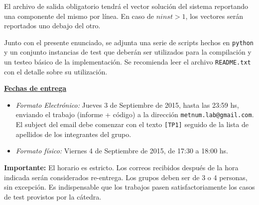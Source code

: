 El archivo de salida obligatorio tendr\'a el vector soluci\'on del sistema reportando una componente del mismo por
l\'inea. En caso de $ninst > 1$, los vectores ser\'an reportados uno debajo del otro.

Junto con el presente enunciado, se adjunta una serie de scripts hechos en \verb+python+ y un conjunto instancias de
test que deber\'an ser utilizados para la compilaci\'on y un testeo b\'asico de la implementaci\'on. Se recomienda leer
el archivo \verb+README.txt+ con el detalle sobre su utilizaci\'on.

{\bf \underline{Fechas de entrega}}
\begin{itemize}
\item \emph{Formato Electr\'onico:} Jueves 3 de Septiembre de 2015, hasta las 23:59 hs, enviando el trabajo (informe +
c\'odigo) a la direcci\'on \verb+metnum.lab@gmail.com+. El subject del email debe comenzar con el texto \verb+[TP1]+
seguido de la lista de apellidos de los integrantes del grupo.
\item \emph{Formato f\'isico:} Viernes 4 de Septiembre de 2015, de 17:30 a 18:00 hs.
\end{itemize}

\noindent \textbf{Importante:} El horario es estricto. Los correos recibidos despu\'es de la hora indicada ser\'an
considerados re-entrega. Los grupos deben ser de 3 o 4 personas, sin excepci\'on. Es indispensable que los trabajos
pasen satisfactoriamente los casos de test provistos por la c\'atedra.